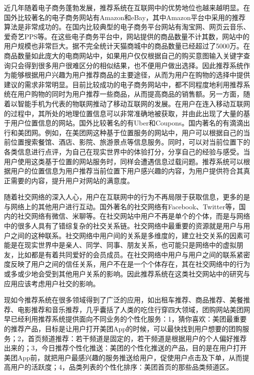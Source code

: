 	近几年随着电子商务蓬勃发展，推荐系统在互联网中的优势地位也越来越明显。在国外比较著名的电子商务网站有Amazon和eBay，其中Amazon平台中采用的推荐算法是非常成功的。在国内比较典型的电子商务平台网站有淘宝网、网页云音乐、爱奇艺PPS等。在这些电子商务平台中，网站提供的商品数量不计其数，网站中的用户规模也非常巨大。据不完全统计天猫商城中的商品数量已经超过了5000万。在商品数量如此庞大的电商网站中，如果用户仅仅根据自己的购买意图输入关键字查询只会得到很多用户很难区分的相似结果，也不便用户做出选择。因此推荐系统作为能够根据用户兴趣\citep{user-interest}为用户推荐商品的主要途径，从而为用户在购物的选择中提供建议的需求非常明显。目前比较成功的电子商务网站中，都不同程度地利用推荐系统在用户购物的同时为用户推荐一些商品，从而提高商品的销售额。另一方面，随着以智能手机为代表的物联网推动了移动互联网的发展。在用户在连入移动互联网的过程中，其所处的地理位置信息可以非常准确地被获取，并由此出现了大量的基于用户位置信息的网站。国外比较著名的有Uber和Coupons。国内著名的有滴滴出行和美团网。例如，在美团网这种基于位置服务的网站中，用户可以根据自己的当前位置搜索餐馆、酒店、影院、旅游景点等信息服务。同时，可以对当前位置下的各类信息进行点评，为自己在现实世界中的体验打分，分享自己的经验与感受。当用户使用这类基于位置的网站服务时，同样会遭遇信息过载问题。推荐系统可以根据用户的位置信息为用户推荐当前位置下用户感兴趣的内容，为用户提供符合其真正需要的内容，提升用户对网站的满意度。

	随着社交网络的深入人心，用户在互联网中的行为不再局限于获取信息，更多的是与网络上的其他用户进行互动。国外著名的社交网络有Facebook、Twitter等，国内的社交网络有微信、米聊等。在社交网站中用户不再是单个的个体，而是与网络中的很多人具有了错综复杂的社交关系链。社交网络中最重要的资源就是用户与用户之间的这种联系。社交网络中用户间的关系是多维度的，建立社交关系的因素可能是在现实世界中是亲人、同学、同事、朋友关系，也可能只是网络中的虚拟朋友，比如都是有着共同爱好的会员成员。在社交网络中用户与用户之间的联系紧密度反映了用户之间的信任关系，用户不在是一个个体存在，其在社交网络中的行为或多或少地会受到其他用户关系的影响。因此推荐系统在这类社交网站中的研究与应用应该考虑用户社交的影响。

	现如今推荐系统在很多领域得到了广泛的应用，如出租车推荐、商品推荐、美餐推荐、电影推荐和音乐推荐，几乎囊括了人类的吃住行穿四大领域，团购网站美团网早已经利用推荐系统提供面向不同业务的个性化服务：1，猜你喜欢：美团最重要的推荐产品，目标是让用户打开美团App的时候，可以最快找到用户想要的团购服务；2，首页频道推荐：若干频道是固定的，若干频道是根据用户的个人偏好推荐出来的；3，今日推荐个性化推送：美团的个性化推送的产品，目的是在用户打开美团App前，就把用户最感兴趣的服务推送给用户，促使用户点击及下单，从而提高用户的活跃度；4，品类列表的个性化排序：美团首页的那些品类频道区。


